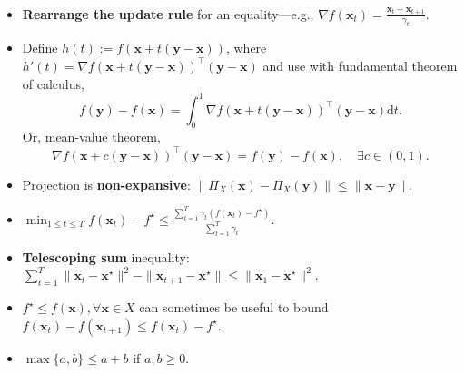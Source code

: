 \documentclass[a4paper]{article}
\renewcommand{\vec}[1]{\mathbf{#1}}
\newenvironment{topic}[1]
{\textbf{\sffamily \colorbox{black}{\rlap{\textbf{\textcolor{white}{#1}}}\hspace{\linewidth}\hspace{-2\fboxsep}}} \\ \vspace{0.2cm}}
{}
\begin{document}
\begin{multicols*}{2}
    \begin{topic}{Common tricks}
        \begin{itemize}
            \item \textbf{Rearrange the update rule} for an equality---e.g., $\nabla f(\vec{x}_t) = \frac{\vec{x}_t -
                          \vec{x}_{t+1}}{\gamma_t}$.
            \item Define $h(t) := f(\vec{x} + t(\vec{y} - \vec{x}))$, where $h'(t) = \nabla f(\vec{x} + t(\vec{y} -
                      \vec{x}))^\top (\vec{y} - \vec{x})$ and use with fundamental theorem of calculus, \[
                      f(\vec{y}) - f(\vec{x}) = \int_0^1 \nabla f(\vec{x} + t(\vec{y} - \vec{x}))^\top (\vec{y} - \vec{x}) \mathrm{d}t.
                  \]
                  Or, mean-value theorem, \[
                      \nabla f(\vec{x} + c(\vec{y} - \vec{x}))^\top (\vec{y} - \vec{x}) = f(\vec{y}) - f(\vec{x}), \quad \exists c \in (0,1).
                  \]
            \item Projection is \textbf{non-expansive}: $\| \Pi_X(\vec{x}) - \Pi_X(\vec{y}) \| \leq \| \vec{x} -
                      \vec{y} \|$.
            \item $\min_{1 \leq t \leq T} f(\vec{x}_t) - f^\star \leq \frac{\sum_{t=1}^{T} \gamma_t (f(\vec{x}_t) - f^\star)}{\sum_{t=1}^{T} \gamma_t}$.
            \item \textbf{Telescoping sum} inequality:\\ $\sum_{t=1}^{T} \| \vec{x}_t - \vec{x}^\star \|^2 - \| \vec{x}_{t+1} -
                      \vec{x}^\star \| \leq \| \vec{x}_1 - \vec{x}^\star \|^2$.
            \item $f^\star \leq f(\vec{x}), \forall \vec{x} \in X$ can sometimes be useful to bound $f(\vec{x}_t) - f(\vec{x}_{t+1}) \leq f(\vec{x}_t) - f^\star$.
            \item $\max \{ a,b \} \leq a + b$ if $a,b \geq 0$.
        \end{itemize}
    \end{topic}


\end{multicols*}
\end{document}
